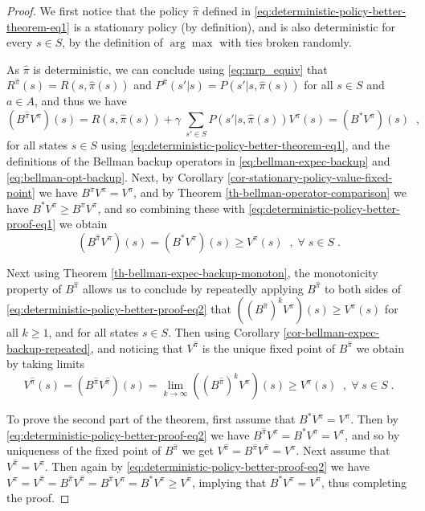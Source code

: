 \documentclass{article}
\theoremstyle{definition}
\theoremstyle{remark}
\begin{document}
\begin{proof}
We first notice that the policy $\hat{\pi}$ defined in \eqref{eq:deterministic-policy-better-theorem-eq1} is a stationary policy (by definition), and is also deterministic for every $s \in S$, by the definition of $\arg\max$ with ties broken randomly.

As $\hat{\pi}$ is deterministic, we can conclude using \eqref{eq:mrp_equiv} that $R^{\hat{\pi}}(s) = R(s,\hat{\pi}(s))$ and $P^{\hat{\pi}}(s'|s)=P(s'|s,\hat{\pi}(s))$ for all $s \in S$ and $a \in A$, and thus we have
\begin{equation}
(B^{\hat{\pi}}V^{\pi})(s) = R(s,\hat{\pi}(s)) + \gamma \; \sum_{s' \in S} P(s'|s,\hat{\pi}(s)) V^{\pi}(s) = (B^{\ast}V^{\pi})(s) \;\;,
\label{eq:deterministic-policy-better-proof-eq1}
\end{equation}
for all states $s \in S$ using \eqref{eq:deterministic-policy-better-theorem-eq1}, and the definitions of the Bellman backup operators in \eqref{eq:bellman-expec-backup} and \eqref{eq:bellman-opt-backup}. Next, by Corollary \ref{cor-stationary-policy-value-fixed-point} we have $B^{\pi}V^{\pi} = V^{\pi}$, and by Theorem \ref{th-bellman-operator-comparison} we have $B^{\ast}V^{\pi} \geq B^{\pi}V^{\pi}$, and so combining these with \eqref{eq:deterministic-policy-better-proof-eq1} we obtain
\begin{equation}
(B^{\hat{\pi}}V^{\pi})(s) = (B^{\ast}V^{\pi})(s) \geq V^{\pi}(s) \;\;,\; \forall \; s \in S \;.
\label{eq:deterministic-policy-better-proof-eq2}
\end{equation}

Next using Theorem \ref{th-bellman-expec-backup-monoton}, the monotonicity property of $B^{\hat{\pi}}$ allows us to conclude by repeatedly applying $B^{\hat{\pi}}$ to both sides of \eqref{eq:deterministic-policy-better-proof-eq2} that $((B^{\hat{\pi}})^{k}V^{\pi})(s) \geq V^{\pi}(s)$ for all $k \geq 1$, and for all states $s \in S$. Then using Corollary \ref{cor-bellman-expec-backup-repeated}, and noticing that $V^{\hat{\pi}}$ is the unique fixed point of $B^{\hat{\pi}}$ we obtain by taking limits
\begin{equation}
V^{\hat{\pi}}(s) = (B^{\hat{\pi}}V^{\hat{\pi}})(s) = \lim_{k \rightarrow \infty} ((B^{\hat{\pi}})^{k}V^{\pi})(s) \geq V^{\pi}(s) \;\;,\; \forall \; s \in S \;.
\label{eq:deterministic-policy-better-proof-eq3}
\end{equation}

To prove the second part of the theorem, first assume that $B^{\ast}V^{\pi} = V^{\pi}$. Then by \eqref{eq:deterministic-policy-better-proof-eq2} we have $B^{\hat{\pi}}V^{\pi} = B^{\ast}V^{\pi} = V^{\pi}$, and so by uniqueness of the fixed point of $B^{\hat{\pi}}$ we get $V^{\hat{\pi}} = B^{\hat{\pi}}V^{\hat{\pi}} = V^{\pi}$. Next assume that $V^{\hat{\pi}} = V^{\pi}$. Then again by \eqref{eq:deterministic-policy-better-proof-eq2} we have $V^{\pi} = V^{\hat{\pi}} = B^{\hat{\pi}}V^{\hat{\pi}} = B^{\hat{\pi}}V^{\pi} = B^{\ast}V^{\pi} \geq V^{\pi}$, implying that $B^{\ast}V^{\pi} = V^{\pi}$, thus completing the proof.
\end{proof}
\end{document}
